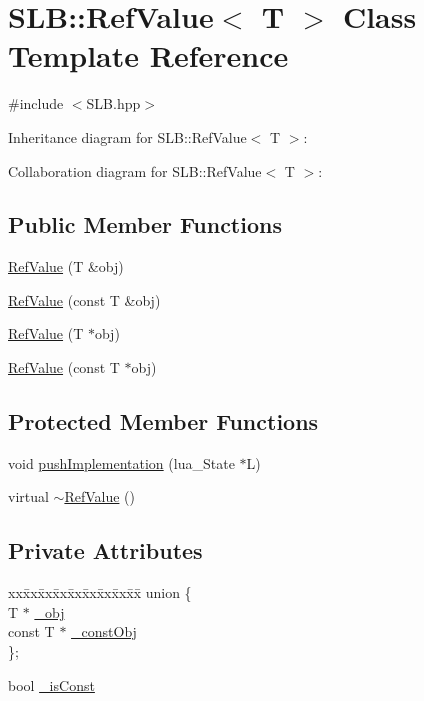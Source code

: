\hypertarget{classSLB_1_1RefValue}{}\section{S\+LB\+:\+:Ref\+Value$<$ T $>$ Class Template Reference}
\label{classSLB_1_1RefValue}


{\ttfamily \#include $<$S\+L\+B.\+hpp$>$}



Inheritance diagram for S\+LB\+:\+:Ref\+Value$<$ T $>$\+:


Collaboration diagram for S\+LB\+:\+:Ref\+Value$<$ T $>$\+:
\subsection*{Public Member Functions}
\begin{DoxyCompactItemize}
\item 
\hyperlink{classSLB_1_1RefValue_aebb602f3014b70a80c080f58c9936976}{Ref\+Value} (T \&obj)
\item 
\hyperlink{classSLB_1_1RefValue_a462428b392dfb84af9c2734fd074dfa9}{Ref\+Value} (const T \&obj)
\item 
\hyperlink{classSLB_1_1RefValue_ac6a7865494a2ce8c0743221a00a9d089}{Ref\+Value} (T $\ast$obj)
\item 
\hyperlink{classSLB_1_1RefValue_a08dc0dc94c2e924c39ceda454ab9ede0}{Ref\+Value} (const T $\ast$obj)
\end{DoxyCompactItemize}
\subsection*{Protected Member Functions}
\begin{DoxyCompactItemize}
\item 
void \hyperlink{classSLB_1_1RefValue_a73c6c1745d94ef32c9d15ebf00e33697}{push\+Implementation} (lua\+\_\+\+State $\ast$L)
\item 
virtual \hyperlink{classSLB_1_1RefValue_a022bb18c819792c0537036767f3be65b}{$\sim$\+Ref\+Value} ()
\end{DoxyCompactItemize}
\subsection*{Private Attributes}
\begin{DoxyCompactItemize}
\item 
\begin{tabbing}
xx\=xx\=xx\=xx\=xx\=xx\=xx\=xx\=xx\=\kill
union \{\\
\>T $\ast$ \hyperlink{classSLB_1_1RefValue_ad2d7be8cda83586403d85e69e30e036f}{\_obj}\\
\>const T $\ast$ \hyperlink{classSLB_1_1RefValue_a941262995dc0684ac8b66bdcaace44c1}{\_constObj}\\
\}; \\

\end{tabbing}\item 
bool \hyperlink{classSLB_1_1RefValue_ab2962578f1a0c8d9a5941ec6f05fc31c}{\+\_\+is\+Const}
\end{DoxyCompactItemize}



